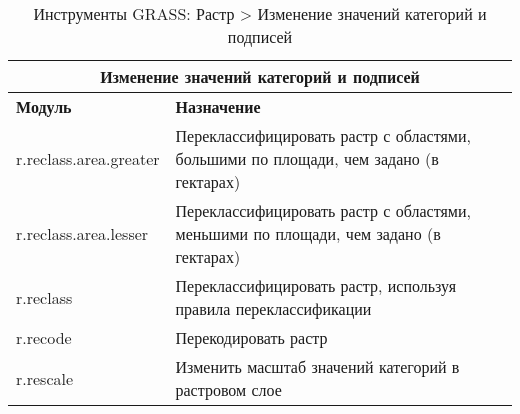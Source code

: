 {\renewcommand{\arraystretch}{0.7}
\begin{table}[H]
\centering
 \begin{tabular}{|p{4cm}|p{10cm}|}
  \hline \multicolumn{2}{|c|}{\textbf{Изменение значений категорий и подписей}} \\
  \hline \textbf{Модуль} & \textbf{Назначение} \\
  \hline r.reclass.area.greater & Переклассифицировать растр с областями,
  большими по площади, чем задано (в гектарах) \\
  \hline r.reclass.area.lesser & Переклассифицировать растр с областями,
  меньшими по площади, чем задано (в гектарах) \\
  \hline r.reclass & Переклассифицировать растр, используя правила
  переклассификации \\
  \hline r.recode & Перекодировать растр \\
  \hline r.rescale & Изменить масштаб значений категорий в растровом слое \\
\hline
\end{tabular}
\caption{Инструменты GRASS: Растр > Изменение значений категорий и подписей}
\end{table}}

